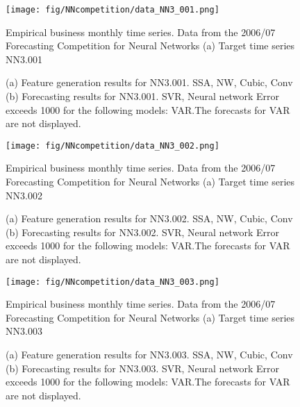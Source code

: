 \documentclass[12pt]{article}
\begin{document}
\begin{figure}
\centering
\texttt{[image: fig/NNcompetition/data\_NN3\_001.png]}
\caption{Empirical business monthly time series. Data from the 2006/07 Forecasting Competition for Neural Networks	(a) Target time series	NN3.001	}
\end{figure}


\begin{figure}
\centering
{}
\caption{(a)	Feature generation results for	NN3.001.	SSA, NW, Cubic, Conv	(b)	Forecasting results for	NN3.001.	SVR, Neural network	Error exceeds 1000 for the following models: VAR.The forecasts for VAR are not displayed.	}
\end{figure}


\begin{figure}
\centering
\texttt{[image: fig/NNcompetition/data\_NN3\_002.png]}
\caption{Empirical business monthly time series. Data from the 2006/07 Forecasting Competition for Neural Networks	(a) Target time series	NN3.002	}
\end{figure}


\begin{figure}
\centering
{}
\caption{(a)	Feature generation results for	NN3.002.	SSA, NW, Cubic, Conv	(b)	Forecasting results for	NN3.002.	SVR, Neural network	Error exceeds 1000 for the following models: VAR.The forecasts for VAR are not displayed.	}
\end{figure}


\begin{figure}
\centering
\texttt{[image: fig/NNcompetition/data\_NN3\_003.png]}
\caption{Empirical business monthly time series. Data from the 2006/07 Forecasting Competition for Neural Networks	(a) Target time series	NN3.003	}
\end{figure}


\begin{figure}
\centering
{}
\caption{(a)	Feature generation results for	NN3.003.	SSA, NW, Cubic, Conv	(b)	Forecasting results for	NN3.003.	SVR, Neural network	Error exceeds 1000 for the following models: VAR.The forecasts for VAR are not displayed.	}
\end{figure}
\end{document}
